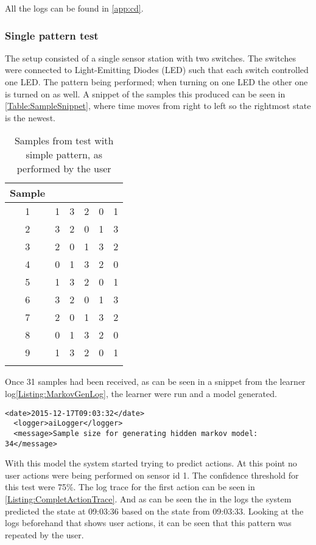All the logs can be found in \cref{app:cd}. 
\subsubsection{Single pattern test}
The setup consisted of a single sensor station with two switches. The switches were connected to  Light-Emitting Diodes (LED) such that each switch controlled one LED. The pattern being performed; when turning on one LED the other one is turned on as well. A snippet of the samples this produced can be seen in \cref{Table:SampleSnippet}, where time moves from right to left so the rightmost state is the newest.
\begin{center}

\begin{table}[htbp]
  \centering
  \begin{tabular}{c c c c c c}
    \toprule
    Sample & & & & &  \\ \midrule
    1 & 1 & 3 & 2 & 0 & 1 \\
    2 & 3 & 2 & 0 & 1 & 3 \\
    3 & 2 & 0 & 1 & 3 & 2 \\
    4 & 0 & 1 & 3 & 2 & 0 \\
    5 & 1 & 3 & 2 & 0 & 1 \\
    6 & 3 & 2 & 0 & 1 & 3 \\
    7 & 2 & 0 & 1 & 3 & 2 \\
    8 & 0 & 1 & 3 & 2 & 0 \\
    9 & 1 & 3 & 2 & 0 & 1 \\
     \\ \bottomrule
  \end{tabular}
  \caption{Samples from test with simple pattern, as performed by the user}
\end{table}

\label{Table:SampleSnippet}
\end{center}
Once 31 samples had been received, as can be seen in a snippet from the learner log\cref{Listing:MarkovGenLog}, the learner were run and a model generated.
\lstset{language=xml}
\begin{lstlisting}[label = Listing:MarkovGenLog, caption = Snippet of log from model generation]
  <date>2015-12-17T09:03:32</date>
  <logger>aiLogger</logger>
  <message>Sample size for generating hidden markov model: 34</message>
\end{lstlisting}
With this model the system started trying to predict actions. At this point no user actions were being performed on sensor id 1. The confidence threshold for this test were 75\%. The log trace for the first action can be seen in \cref{Listing:CompletActionTrace}. And as can be seen the in the logs the system predicted the state at 09:03:36 based on the state from 09:03:33. Looking at the logs beforehand that shows user actions, it can be seen that this pattern was repeated by the user.
